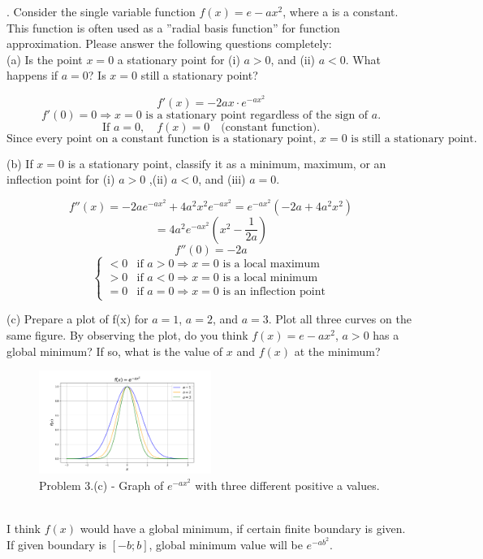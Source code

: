 \documentclass{article} %
\begin{document}
{    . Consider the single variable function $ f(x) = e - ax^2 $, where a is a constant. This function is often used as
    a ”radial basis function” for function approximation. Please answer the following questions completely: \\

    \noindent (a) Is the point $ x = 0 $ a stationary point for (i) $ a > 0 $, and (ii) $ a < 0 $. What happens if $ a = 0 $? Is
    $ x = 0 $ still a stationary point?

    \[
        f'(x) = -2ax \cdot e^{-ax^2}
        \]
        \[
        f'(0) = 0 \Rightarrow x = 0 \text{ is a stationary point regardless of the sign of } a.
        \]
        \[
        \text{If } a = 0, \quad f(x) = 0 \quad \text{(constant function).}
        \]
        \[
        \text{Since every point on a constant function is a stationary point, } x = 0 \text{ is still a stationary point.}
    \]

    \noindent (b) If $ x = 0 $ is a stationary point, classify it as a minimum, maximum, or an inflection point for (i)
    $ a > 0 $ ,(ii) $ a < 0 $, and (iii) $ a = 0 $.

    \[
        f''(x) = -2a e^{-ax^2} + 4a^2 x^2 e^{-ax^2} = e^{-ax^2} (-2a + 4a^2 x^2)
        \]
        \[
        = 4a^2 e^{-ax^2} \left(x^2 - \frac{1}{2a} \right)
        \]
        \[
        f''(0) = -2a
        \]
        \[
        \begin{cases}
        < 0 & \text{if } a > 0 \Rightarrow x = 0 \text{ is a local maximum} \\
        > 0 & \text{if } a < 0 \Rightarrow x = 0 \text{ is a local minimum} \\
        = 0 & \text{if } a = 0 \Rightarrow x = 0 \text{ is an inflection point}
        \end{cases}
    \]

    \noindent (c) Prepare a plot of f(x) for $ a = 1 $, $ a = 2 $, and $ a = 3 $. Plot all three curves on the same figure. By
    observing the plot, do you think $ f(x) = e - ax^2 $, $ a > 0 $ has a global minimum? If so, what is the
    value of $ x $ and $ f(x) $ at the minimum? \\
        \begin{figure}[h!]
        \centering
        \includegraphics[width=0.5\textwidth]{generated_image2.png}
        \caption{Problem 3.(c) - Graph of $e^{-ax^2}$ with three different positive a values.}
        \label{fig2}
        \end{figure} \\
    I think $f(x)$ would have a global minimum, if certain finite boundary is given.
    If given boundary is $[-b; b]$, global minimum value will be $e^{-ab^2}$. \\

}
\end{document}
